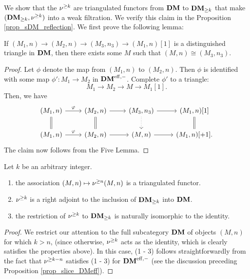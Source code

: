 We show that the $\sgDM{k}$ are triangulated functors from $\DM$
to $\GFiltDM[k]{\DM}$ that make $(\GFiltDM[k]{\DM}, \sgDM{k})$ 
into a weak filtration. We verify this claim in the Proposition 
\ref{prop_sDM_reflection}. We first prove the following lemma:

\begin{lem}\label{lem_triangle_in_DM}
If $(M_1, n) \to (M_2, n) \to (M_3, n_3) \to (M_1, n)[1]$
is a distinguished triangle in $\DM$, then there exists some $M$ 
such that $(M, n) \cong (M_3, n_3)$.
\end{lem}
\begin{proof}
Let $\phi$ denote the map from $(M_1, n)$ to $(M_2, n)$. Then
$\phi$ is identified with some map $\phi': M_1 \to M_2$ in 
$\DMeff$. Complete $\phi'$ to a triangle:
\[
M_1 \to M_2 \to M \to M_1[1].
\]
Then, we have
\[
\begin{tikzcd}
(M_1, n) \arrow{r}{\phi} \arrow[equals]{d} &
(M_2, n) \arrow{r} \arrow[equals]{d} &
(M_3, n_3) \arrow{r} \arrow[dotted]{d} &
(M_1, n)[1] \arrow[equals]{d}\\
(M_1, n) \arrow{r}{\phi} &
(M_2, n) \arrow{r} &
(M, n) \arrow{r} &
(M_1, n)[+1].
\end{tikzcd}
\]
The claim now follows from the Five Lemma.
\end{proof}

\begin{prop}\label{prop_sDM_reflection}
Let $k$ be an arbitrary integer.

\begin{enumerate}
\item the association $(M, n) \mapsto \sgDM{n} (M, n)$ is 
a triangulated functor.

\item $\sgDM{k}$ is a right adjoint to the inclusion of 
$\GFiltDM[k]{\DM}$ into $\DM$.

\item the restriction of $\sgDM{k}$ to $\GFiltDM[k]{\DM}$ is 
naturally isomorphic to the identity.
\end{enumerate}
\end{prop}
\begin{proof}
We restrict our attention to the full subcategory $\DM$ of objects 
$(M, n)$ for which $k > n$, (since otherwise, $\sgDM{k}$ acts as 
the identity, which is clearly satisfies the properties above). In 
this case, (1 - 3) follows straightforwardly from the fact that
$\sgDM{k - n}$ satisfies (1 - 3) for $\DMeff$ (see the discussion
preceding Proposition \ref{prop_slice_DMeff}).
\end{proof}

